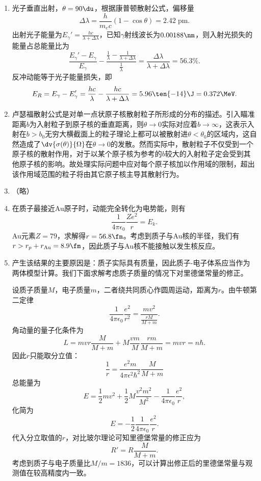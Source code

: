 \begin{enumerate}[label=1.\arabic*]
\item
光子垂直出射，$\theta=90\du$，根据康普顿散射公式，偏移量
\[\Delta\lambda = \frac{h}{m_e c}(1-\cos\theta) = 2.42\;\mathrm{pm}.\]
出射光子能量为$E_\gamma' = \frac{hc}{\lambda+\Delta\lambda}$，已知$\gamma$射线波长为$0.00188\nm$，则入射光损失的能量占总能量比为
\[\frac{E_\gamma'-E_\gamma}{E_\gamma} - \frac{\frac{1}{\lambda}-\frac{1}{\lambda+\Delta\lambda}}{\frac{1}{\lambda}} = \frac{\Delta\lambda}{\lambda+\Delta\lambda} = 56.3\%.\]
反冲动能等于光子能量损失，即
\[E_R = E_\gamma-E_\gamma' = \frac{hc}{\lambda}-\frac{hc}{\lambda+\Delta\lambda} = 5.96\ten{-14}\J = 0.372\MeV.\]

\item
卢瑟福散射公式是对单一点状原子核散射粒子所形成的分布的描述。引入瞄准距离$b$为入射粒子到原子核的垂直距离，则$\theta \rightarrow 0$实际对应着$b \rightarrow \infty$，这表示入射在$b>b_0$无穷大横截面上的粒子理论上都可以被散射进$\theta < \theta_0$的区域内，这自然造成了$\dv{\sigma(\theta)}{\Omega}$在$\theta \rightarrow 0$的发散。然而实际中，散射粒子不仅受到一个原子核的散射作用，对于以某个原子核为参考的$b$较大的入射粒子定会受到其他原子核的影响。故处理实际问题中应对每个原子核加以作用域的限制，超出该作用域范围的粒子将由其它原子核主导其散射行为。

\item
（略）

\item
在质子最接近Au原子时，动能完全转化为电势能，则有
\[\frac{1}{4\pi\epsilon_0}\frac{Ze^2}{r} = E_k.\]
Au元素$Z=79$，求解得$r=56.8\fm$。考虑到质子与Au核的半径，我们有$r>r_p+r_\mathrm{Au} = 8.9\fm$，因此质子与Au核不能接触以发生核反应。

\item
产生该结果的主要原因是：质子实际具有质量，因此质子-电子体系应当作为两体模型计算。我们下面求解考虑质子质量的情况下对里德堡常量的修正。

设质子质量$M$，电子质量$m$，二者绕共同质心作圆周运动，距离为$r$。由牛顿第二定律
\[\frac{1}{4\pi\epsilon_0}\frac{e^2}{r^2} = \frac{mv^2}{\frac{rM}{M+m}}.\]
角动量的量子化条件为
\[L = mvr\frac{M}{M+m}+M\frac{vm}{M}\frac{rm}{M+m} = mvr = n\hbar.\]
因此$r$只能取分立值：
\[\frac{1}{r} = \frac{e^2 m}{4\pi\epsilon^2\hbar^2}\frac{M}{M+m}\]
总能量为
\[E = \frac{1}{2}mv^2+\frac{1}{2}M\frac{v^2m^2}{M^2}-\frac{1}{4\pi\epsilon_0}\frac{e^2}{r}, \]
化简为
\[E = -\frac{1}{2}\frac{1}{4\pi\epsilon_0}\frac{e^2}{r}.\]
代入分立取值的$r$，对比玻尔理论可知里德堡常量的修正应为
\[R' = R\frac{M}{M+m}.\]
考虑到质子与电子质量比$M/m=1836$，可以计算出修正后的里德堡常量与观测值在较高精度内一致。


\end{enumerate}
